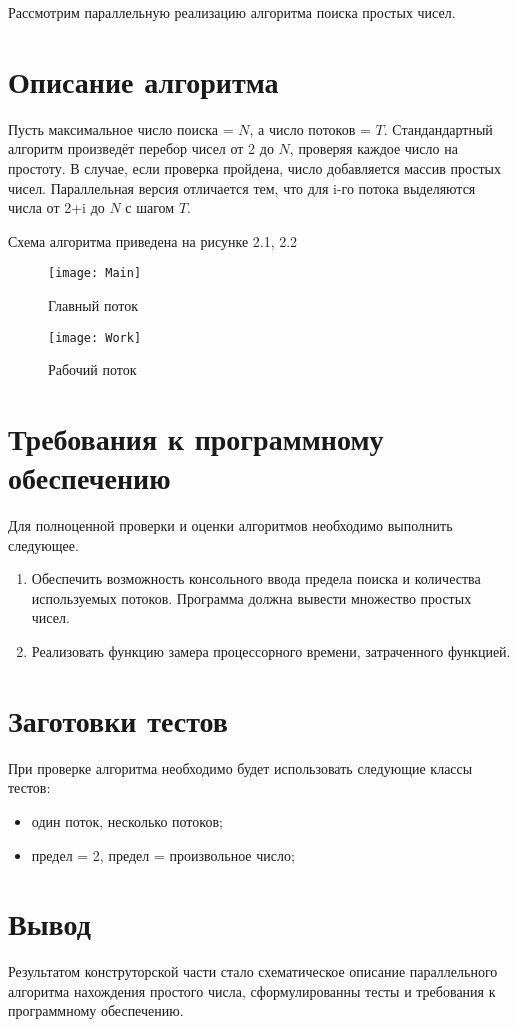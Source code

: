 Рассмотрим параллельную реализацию алгоритма поиска простых чисел.

\section{Описание алгоритма}
Пусть максимальное число поиска = $N$, а число потоков = $T$. Стандандартный алгоритм произведёт перебор чисел от 2 до $N$, проверяя каждое число на простоту. В случае, если проверка пройдена, число добавляется массив простых чисел. Параллельная версия отличается тем, что для i-го потока выделяются числа от 2+i до $N$ с шагом $T$.

Схема алгоритма приведена на рисунке 2.1, 2.2
\begin{figure}[h]
	\begin{center}
		{\texttt{[image: Main]}}
		\caption{Главный поток}
	\end{center}
\end{figure}
\begin{figure}[h]
	\begin{center}
		{\texttt{[image: Work]}}
		\caption{Рабочий поток}
	\end{center}
\end{figure}



\section{Требования к программному обеспечению}
Для полноценной проверки и оценки алгоритмов необходимо выполнить следующее.
\begin{enumerate}
	\item Обеспечить возможность консольного ввода предела поиска и количества используемых потоков. Программа должна вывести множество простых чисел.
	\item Реализовать функцию замера процессорного времени, затраченного функцией.
\end{enumerate}


\section{Заготовки тестов}
При проверке алгоритма необходимо будет использовать следующие классы тестов:
\begin{itemize}
	\item один поток, несколько потоков;
	\item предел = 2, предел = произвольное число;
\end{itemize}

\section*{Вывод}
Результатом конструторской части стало схематическое описание параллельного алгоритма нахождения простого числа, сформулированны тесты и требования к программному обеспечению.



